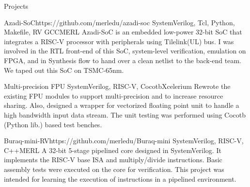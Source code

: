 \documentclass{resume} %
\begin{document}

\begin{rSection}{Projects}

\begin{rSubsection}{Azadi-SoC}{https://github.com/merledu/azadi-soc}
{SystemVerilog, Tcl, Python, Makefile, RV GCC}{MERL}
Azadi-SoC is an embedded low-power 32-bit SoC that integrates a RISC-V processor with peripherals using Tilelink(UL) bus. I was involved in the RTL front-end of this SoC, system-level verification, emulation on FPGA, and in Synthesis flow to hand over a clean netlist to the back-end team. We taped out this SoC on TSMC-65nm.

\end{rSubsection}

\begin{rSubsection}{Multi-precision FPU}{}
{SystemVerilog, RISC-V, Cocotb}{Xcelerium}
Rewrote the existing FPU modules to support multi-precision and to increase resource sharing. Also, designed a wrapper for vectorized floating point unit to handle a high bandwidth input data stream. The unit testing was performed using Cocotb (Python lib.) based test benches.

\end{rSubsection}

\begin{rSubsection}{Buraq-mini-RV}{https://github.com/merledu/Buraq-mini}
{SystemVerilog, RISC-V, C++}{MERL}
A 32-bit 5-stage pipelined core designed in SystemVerilog. It implements the RISC-V base ISA and multiply/divide instructions. Basic assembly tests were executed on the core for verification. This project was intended for learning the execution of instructions in a pipelined environment. 

\end{rSubsection}
    
\end{rSection}

\end{document}
